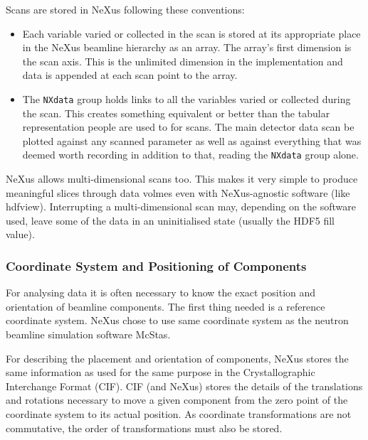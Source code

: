 \documentclass[%
 aip,
rsi,
 amsmath,amssymb,
 reprint,%
]{revtex4-1}
\begin{document}
Scans are stored in NeXus following these conventions: 
\begin{itemize}
\item Each variable varied or collected in the scan is stored at its appropriate place in the NeXus beamline 
 hierarchy as an array. The array's first dimension is the scan axis. This is the unlimited dimension in 
 the implementation and data is appended at each scan point to the array. 
\item The \texttt{NXdata} group holds links to all the variables varied or collected during the scan. 
 This creates something equivalent or better than the tabular representation people are used to for scans. 
 The main detector data scan be plotted against any scanned parameter as well as against everything that was 
 deemed worth recording in addition to that, reading the \texttt{NXdata} group alone. 
\end{itemize}

NeXus allows multi-dimensional scans too. This makes it very simple to produce meaningful slices through data 
volmes even with NeXus-agnostic software (like hdfview). Interrupting a multi-dimensional scan may, depending 
on the software used, leave some of the data in an uninitialised state (usually the HDF5 fill value).

\subsubsection{Coordinate System and Positioning of Components}

For analysing data it is often necessary to know the exact position and orientation of beamline components. 
The first thing needed is a reference coordinate system. NeXus chose to use same coordinate system as the 
neutron beamline simulation software McStas\cite{mcstas}. 

For describing the placement and orientation of components, NeXus stores the same information as used for the 
same purpose in the Crystallographic Interchange Format (CIF)\cite{ITCVG}. CIF (and NeXus) stores the details 
of the translations and rotations necessary to move a given component from the zero point of the coordinate 
system to its actual position. As coordinate transformations are not commutative, the order of transformations 
must also be stored.
\end{document}
